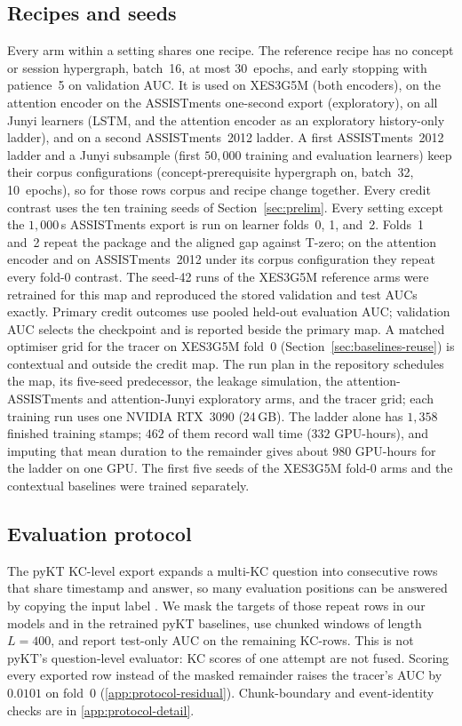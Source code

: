 \documentclass[review,12pt]{elsarticle}
\begin{document}
\subsection{Recipes and seeds}
\label{sec:credit-gate}
Every arm within a setting shares one recipe. The reference recipe has
no concept or session hypergraph, batch~16, at most 30~epochs, and early
stopping with patience~5 on validation AUC. It is used on XES3G5M (both
encoders), on the attention encoder on the ASSISTments one-second
export (exploratory), on all Junyi learners (LSTM, and the attention
encoder as an exploratory history-only ladder), and on a second
ASSISTments~2012 ladder. A first ASSISTments~2012 ladder and a Junyi
subsample (first $50{,}000$ training and evaluation learners) keep their
corpus configurations (concept-prerequisite hypergraph on, batch~32,
10~epochs), so for those rows corpus and recipe change together. Every
credit contrast uses the ten training seeds of Section~\ref{sec:prelim}.
Every setting except the $1{,}000$\,s ASSISTments export is run on
learner folds~0, 1, and~2. Folds~1 and~2 repeat the package and the
aligned gap against T-zero; on the attention encoder and on
ASSISTments~2012 under its corpus configuration they repeat every
fold-0 contrast. The seed-42 runs of the XES3G5M reference arms were
retrained for this map and reproduced the stored validation and test
AUCs exactly. Primary credit outcomes use pooled held-out evaluation
AUC; validation
AUC selects the checkpoint and is reported beside the primary map. A
matched optimiser grid for the tracer on XES3G5M fold~0
(Section~\ref{sec:baselines-reuse}) is contextual and outside the credit
map. The run plan in the repository schedules the map, its five-seed
predecessor, the leakage simulation, the attention-ASSISTments and
attention-Junyi exploratory arms, and the tracer grid; each training run uses one
NVIDIA RTX~3090 (24\,GB). The ladder alone has $1{,}358$ finished
training stamps; $462$ of them record wall time ($332$ GPU-hours), and
imputing that mean duration to the remainder gives about $980$
GPU-hours for the ladder on one GPU. The first five seeds of the
XES3G5M fold-0 arms and the contextual baselines were trained
separately.

\subsection{Evaluation protocol}
\label{sec:clean-protocol}
The pyKT KC-level export expands a multi-KC question into consecutive
rows that share timestamp and answer, so many evaluation positions can
be answered by copying the input label \cite{liu2022pykt}. We mask the
targets of those repeat rows in our models and in the retrained pyKT
baselines, use chunked windows of length $L{=}400$, and report test-only
AUC on the remaining KC-rows. This is not pyKT's question-level
evaluator: KC scores of one attempt are not fused. Scoring every
exported row instead of the masked remainder raises the tracer's AUC by
$0.0101$ on fold~0 (\ref{app:protocol-residual}). Chunk-boundary and
event-identity checks are in \ref{app:protocol-detail}.
\end{document}
